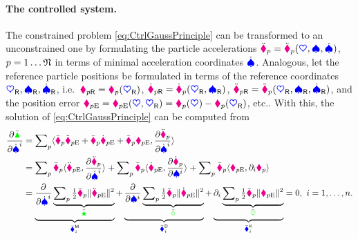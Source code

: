 \paragraph{The controlled system.}
The constrained problem \eqref{eq:CtrlGaussPrinciple} can be transformed to an unconstrained one by formulating the particle accelerations $\ddot{\boldsymbol{\textcolor{magenta}{\blacklozenge}}}_{p} = \ddot{\boldsymbol{\textcolor{magenta}{\blacklozenge}}}_{p}(\boldsymbol{\textcolor{blue}{\heartsuit}}, \boldsymbol{\textcolor{blue}{\spadesuit}}, \dot{\boldsymbol{\textcolor{blue}{\spadesuit}}})$, $p=1\ldots\mathfrak{N}$ in terms of minimal acceleration coordinates $\dot{\boldsymbol{\textcolor{blue}{\spadesuit}}}$.
Analogous, let the reference particle positions be formulated in terms of the reference coordinates $\boldsymbol{\textcolor{blue}{\heartsuit}}_{\mathsf{R}}, \boldsymbol{\textcolor{blue}{\spadesuit}}_{\mathsf{R}}, \dot{\boldsymbol{\textcolor{blue}{\spadesuit}}}_{\mathsf{R}}$, i.e.\ $\boldsymbol{\textcolor{magenta}{\blacklozenge}}_{p\mathsf{R}} = \boldsymbol{\textcolor{magenta}{\blacklozenge}}_{p}(\boldsymbol{\textcolor{blue}{\heartsuit}}_{\mathsf{R}})$, $\dot{\boldsymbol{\textcolor{magenta}{\blacklozenge}}}_{p\mathsf{R}} = \dot{\boldsymbol{\textcolor{magenta}{\blacklozenge}}}_{p}(\boldsymbol{\textcolor{blue}{\heartsuit}}_{\mathsf{R}}, \boldsymbol{\textcolor{blue}{\spadesuit}}_{\mathsf{R}})$, $\ddot{\boldsymbol{\textcolor{magenta}{\blacklozenge}}}_{p\mathsf{R}} = \ddot{\boldsymbol{\textcolor{magenta}{\blacklozenge}}}_{p}(\boldsymbol{\textcolor{blue}{\heartsuit}}_{\mathsf{R}}, \boldsymbol{\textcolor{blue}{\spadesuit}}_{\mathsf{R}}, \dot{\boldsymbol{\textcolor{blue}{\spadesuit}}}_{\mathsf{R}})$, and the position error $\boldsymbol{\textcolor{magenta}{\blacklozenge}}_{p\mathrm{E}} = \boldsymbol{\textcolor{magenta}{\blacklozenge}}_{p\mathrm{E}}(\boldsymbol{\textcolor{blue}{\heartsuit}}, \boldsymbol{\textcolor{blue}{\heartsuit}}_{\mathsf{R}}) = \boldsymbol{\textcolor{magenta}{\blacklozenge}}_{p}(\boldsymbol{\textcolor{blue}{\heartsuit}}) - \boldsymbol{\textcolor{magenta}{\blacklozenge}}_{p}(\boldsymbol{\textcolor{blue}{\heartsuit}}_{\mathsf{R}})$, etc..
With this, the solution of \eqref{eq:CtrlGaussPrinciple} can be computed from
\begin{align}
 \pdiff[\GaussianConstraintC]{\sysVelCoeffd{\LidxI}}
 &= \sumParticles \sProd{\particleMassC{\PidxI} \particlePosEdd{\PidxI} + \particleDampingC{\PidxI} \particlePosEd{\PidxI} + \particleStiffnessC{\PidxI} \particlePosE{\PidxI}}{\pdiff[\particlePosdd{\PidxI}]{\sysVelCoeffd{\LidxI}}}
\nonumber\\
 &= \sumParticles \particleMassC{\PidxI} \sProd{\particlePosEdd{\PidxI}}{\pdiff[\particlePosdd{\PidxI}]{\sysVelCoeffd{\LidxI}}}
  + \sumParticles \particleDampingC{\PidxI} \sProd{\particlePosEd{\PidxI}}{\pdiff[\particlePosd{\PidxI}]{\sysVelCoeff{\LidxI}}}
  + \sumParticles \particleStiffnessC{\PidxI} \sProd{\particlePosE{\PidxI}}{\dirDiff{\LidxI} \particlePos{\PidxI}}
\nonumber\\
 &= \underbrace{\pdiff{\sysVelCoeffd{\LidxI}} \underbrace{\sumParticles \tfrac{1}{2} \particleMassC{\PidxI}      \norm{\particlePosEdd{\PidxI}}^2}_{\accEnergyC}}_{\genForceInertiaCoeffC{\LidxI}}
  + \underbrace{\pdiff{\sysVelCoeff{\LidxI}}  \underbrace{\sumParticles \tfrac{1}{2} \particleDampingC{\PidxI}   \norm{\particlePosEd{\PidxI}}^2}_{\dissFktC}}_{\genForceDissCoeffC{\LidxI}}
  + \underbrace{\dirDiff{\LidxI}              \underbrace{\sumParticles \tfrac{1}{2} \particleStiffnessC{\PidxI} \norm{\particlePosE{\PidxI}}^2}_{\potentialEnergyC}}_{\genForceStiffCoeffC{\LidxI}}
  = 0, \ \LidxI = 1,\ldots,\dimConfigSpace.
\nonumber\\[-4ex]
\label{eq:SolCtrlGaussPrinciple}
\end{align}

